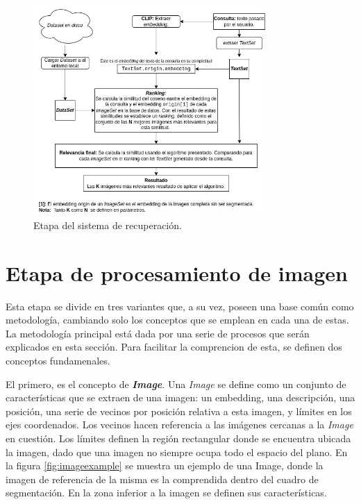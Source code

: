 \begin{figure}[H]
\centering
\includegraphics[height=80mm]{Graphics/SystemRetrieval.drawio.png}
\caption{Etapa del sistema de recuperaci\'on.}
\label{fig:etapa3}
\end{figure}


\section{Etapa de procesamiento de imagen}
Esta etapa se divide en tres variantes que, a su vez, poseen una base común como metodología, cambiando solo los conceptos que se emplean en cada una de estas. La metodología principal está dada por una serie de procesos que serán explicados en esta sección. Para facilitar la comprencion de esta, se definen dos conceptos fundamenales.

El primero, es el concepto de \textbf{\textit{Image}}. Una \textit{Image} se define como un conjunto de características que se extraen de una imagen: un embedding, una descripción, una posición, una serie de vecinos por posición relativa a esta imagen, y límites en los ejes coordenados. Los vecinos hacen referencia a las imágenes cercanas a la \textit{Image} en cuestión. Los límites definen la región rectangular donde se encuentra ubicada la imagen, dado que una imagen no siempre ocupa todo el espacio del plano. En la figura \ref{fig:imageexample} se muestra un ejemplo de una Image, donde la imagen de referencia de la misma es la comprendida dentro del cuadro de segmentaci\'on. En la zona inferior a la imagen se definen sus caracter\'isticas.

